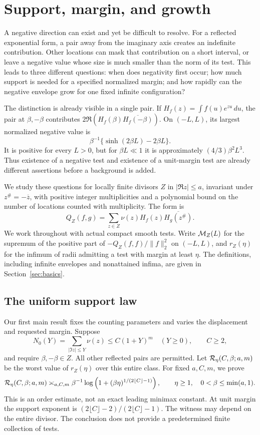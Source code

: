\section{Support, margin, and growth}
\label{sec:introduction}

A negative direction can exist and yet be difficult to resolve.
For a reflected exponential form, a pair away from the imaginary
axis creates an indefinite contribution. Other locations can mask
that contribution on a short interval, or leave a negative value
whose size is much smaller than the norm of its test. This leads
to three different questions: when does negativity first occur;
how much support is needed for a specified normalized margin;
and how rapidly can the negative envelope grow for one fixed
infinite configuration?

The distinction is already visible in a single pair. If
\(H_f(z)=\int f(u)e^{zu}\,du\), the pair at \(\beta,-\beta\)
contributes \(2\Re(H_f(\beta)\overline{H_f(-\beta)})\).
On \((-L,L)\), its largest normalized negative value is
\[
 \beta^{-1}\{\sinh(2\beta L)-2\beta L\}.
\]
It is positive for every \(L>0\), but for \(\beta L\ll1\)
it is approximately \((4/3)\beta^2L^3\). Thus existence of a
negative test and existence of a unit-margin test are already
different assertions before a background is added.

We study these questions for locally finite divisors \(Z\) in
\(|\Re z|\le a\), invariant under \(z^\#=-\overline z\), with
positive integer multiplicities and a polynomial bound on the
number of locations counted with multiplicity. The form is
\[
 Q_Z(f,g)=\sum_{z\in Z}\nu(z)H_f(z)\overline{H_g(z^\#)}.
\]
We work throughout with actual compact smooth tests. Write
\(\mathcal M_Z(L)\) for the supremum of the positive part of
\(-Q_Z(f,f)/\|f\|_2^2\) on \((-L,L)\), and \(r_Z(\eta)\)
for the infimum of radii admitting a test with margin at least
\(\eta\). The definitions, including infinite envelopes and
nonattained infima, are given in Section~\ref{sec:basics}.

\subsection{The uniform support law}
Our first main result fixes the counting parameters and varies
the displacement and requested margin. Suppose
\[
 N_0(Y)=\sum_{|\Im z|\le Y}\nu(z)\le C(1+Y)^m
 \quad(Y\ge0),\qquad C\ge2,
\]
and require \(\beta,-\beta\in Z\). All other reflected pairs
are permitted. Let \(\mathcal R_\eta(C,\beta;a,m)\) be the worst
value of \(r_Z(\eta)\) over this entire class. For fixed
\(a,C,m\), we prove
\begin{equation}\label{intro:frontier}
 \mathcal R_\eta(C,\beta;a,m)\asymp_{a,C,m}
 \beta^{-1}\log\left(1+(\beta\eta)^{1/(2\lfloor C\rfloor-1)}\right),
 \qquad \eta\ge1,\quad0<\beta\le\min(a,1).
\end{equation}
This is an order estimate, not an exact leading minimax constant.
At unit margin the support exponent is
\((2\lfloor C\rfloor-2)/(2\lfloor C\rfloor-1)\).
The witness may depend on the entire divisor. The conclusion
does not provide a predetermined finite collection of tests.

